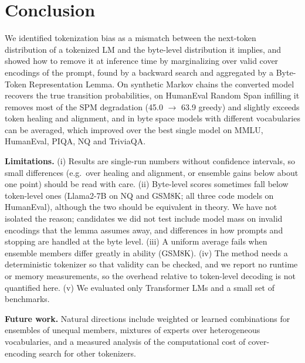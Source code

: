 \documentclass{article} %
\begin{document}
\section{Conclusion}
\label{sec:conclusion}
We identified tokenization bias as a mismatch between the next-token distribution of a tokenized LM and the byte-level distribution it implies, and showed how to remove it at inference time by marginalizing over valid cover encodings of the prompt, found by a backward search and aggregated by a Byte-Token Representation Lemma. On synthetic Markov chains the converted model recovers the true transition probabilities, on HumanEval Random Span infilling it removes most of the SPM degradation (45.0 $\rightarrow$ 63.9 greedy) and slightly exceeds token healing and alignment, and in byte space models with different vocabularies can be averaged, which improved over the best single model on MMLU, HumanEval, PIQA, NQ and TriviaQA.

\textbf{Limitations.} (i) Results are single-run numbers without confidence intervals, so small differences (e.g.\ over healing and alignment, or ensemble gains below about one point) should be read with care. (ii) Byte-level scores sometimes fall below token-level ones (Llama2-7B on NQ and GSM8K; all three code models on HumanEval), although the two should be equivalent in theory. We have not isolated the reason; candidates we did not test include model mass on invalid encodings that the lemma assumes away, and differences in how prompts and stopping are handled at the byte level. (iii) A uniform average fails when ensemble members differ greatly in ability (GSM8K). (iv) The method needs a deterministic tokenizer so that validity can be checked, and we report no runtime or memory measurements, so the overhead relative to token-level decoding is not quantified here. (v) We evaluated only Transformer LMs and a small set of benchmarks.

\textbf{Future work.} Natural directions include weighted or learned combinations for ensembles of unequal members, mixtures of experts over heterogeneous vocabularies, and a measured analysis of the computational cost of cover-encoding search for other tokenizers.




\appendix
\end{document}
